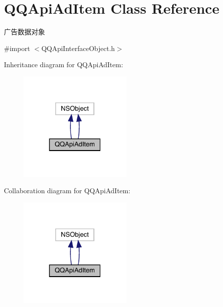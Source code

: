 \hypertarget{interface_q_q_api_ad_item}{}\section{Q\+Q\+Api\+Ad\+Item Class Reference}
\label{interface_q_q_api_ad_item}


广告数据对象  




{\ttfamily \#import $<$Q\+Q\+Api\+Interface\+Object.\+h$>$}



Inheritance diagram for Q\+Q\+Api\+Ad\+Item\+:\nopagebreak
\begin{figure}[H]
\begin{center}
\leavevmode
\includegraphics[width=158pt]{interface_q_q_api_ad_item__inherit__graph}
\end{center}
\end{figure}


Collaboration diagram for Q\+Q\+Api\+Ad\+Item\+:\nopagebreak
\begin{figure}[H]
\begin{center}
\leavevmode
\includegraphics[width=158pt]{interface_q_q_api_ad_item__coll__graph}
\end{center}
\end{figure}
